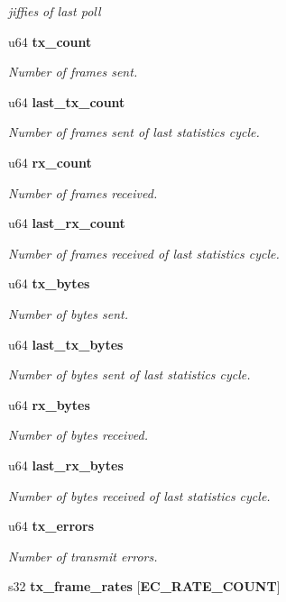\begin{DoxyCompactItemize}
\begin{DoxyCompactList}\small\item\em jiffies of last poll \end{DoxyCompactList}\item 
u64 {\bf tx\-\_\-count}
\begin{DoxyCompactList}\small\item\em Number of frames sent. \end{DoxyCompactList}\item 
u64 {\bf last\-\_\-tx\-\_\-count}
\begin{DoxyCompactList}\small\item\em Number of frames sent of last statistics cycle. \end{DoxyCompactList}\item 
u64 {\bf rx\-\_\-count}
\begin{DoxyCompactList}\small\item\em Number of frames received. \end{DoxyCompactList}\item 
u64 {\bf last\-\_\-rx\-\_\-count}
\begin{DoxyCompactList}\small\item\em Number of frames received of last statistics cycle. \end{DoxyCompactList}\item 
u64 {\bf tx\-\_\-bytes}
\begin{DoxyCompactList}\small\item\em Number of bytes sent. \end{DoxyCompactList}\item 
u64 {\bf last\-\_\-tx\-\_\-bytes}
\begin{DoxyCompactList}\small\item\em Number of bytes sent of last statistics cycle. \end{DoxyCompactList}\item 
u64 {\bf rx\-\_\-bytes}
\begin{DoxyCompactList}\small\item\em Number of bytes received. \end{DoxyCompactList}\item 
u64 {\bf last\-\_\-rx\-\_\-bytes}\label{structec__device_a53f0337afe2d2bdb4b24e2ee4ccb8180}

\begin{DoxyCompactList}\small\item\em Number of bytes received of last statistics cycle. \end{DoxyCompactList}\item 
u64 {\bf tx\-\_\-errors}
\begin{DoxyCompactList}\small\item\em Number of transmit errors. \end{DoxyCompactList}\item 
s32 {\bf tx\-\_\-frame\-\_\-rates} [{\bf E\-C\-\_\-\-R\-A\-T\-E\-\_\-\-C\-O\-U\-N\-T}]\label{structec__device_a0de91079b171a6b07cb724a6362f340b}


\end{DoxyCompactItemize}

